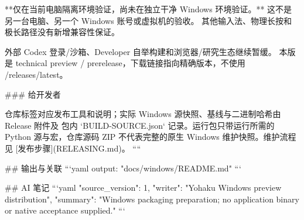 **仅在当前电脑隔离环境验证，尚未在独立干净 Windows 环境验证。**
这不是另一台电脑、另一个 Windows 账号或虚拟机的验收。
其他输入法、物理长按和极长路径没有新增兼容性保证。

外部 Codex 登录/沙箱、Developer 自举构建和浏览器/研究生态继续暂缓。
本版是 technical preview / prerelease，下载链接指向精确版本，不使用 /releases/latest。

### 给开发者

仓库标签对应发布工具和说明；实际 Windows 源快照、基线与二进制哈希由 Release 附件及
包内 `BUILD-SOURCE.json` 记录。运行包只带运行所需的 Python 源与宏，仓库源码 ZIP
不代表完整的原生 Windows 维护快照。维护流程见 [发布步骤](RELEASING.md)。
````

## 输出与关联
```yaml
output: "docs/windows/README.md"
```

## AI 笔记
```yaml
{"source_version": 1, "writer": "Yohaku Windows preview distribution", "summary": "Windows packaging preparation; no application binary or native acceptance supplied."}
```
